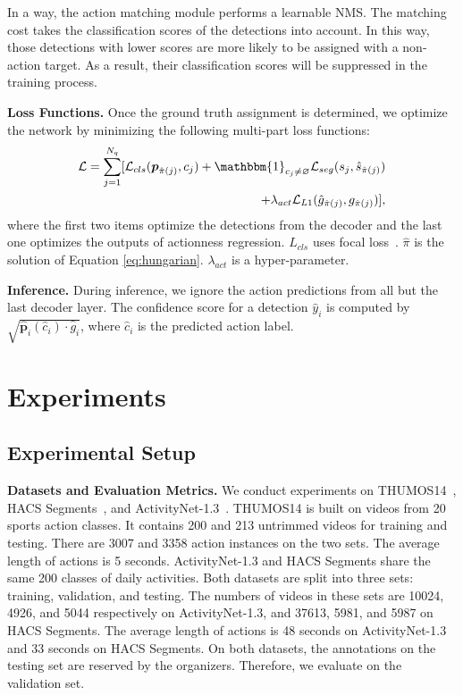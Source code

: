 \documentclass[lettersize,journal]{IEEEtran}
\begin{document}
In a way, the action matching module performs a learnable NMS. The matching cost takes the classification scores of the detections into account. In this way, those detections with lower scores are more likely to be assigned with a non-action target. As a result, their classification scores will be suppressed in the training process.


\vspace{1ex}\noindent\textbf{Loss Functions.} 
Once the ground truth assignment is determined, we optimize the network by minimizing the following multi-part loss functions:
\begin{equation}
\label{eq:loss_func}
\begin{aligned}
    \mathcal{L} = \sum_{j=1}^{N_q} [ \mathcal{L}_{cls}(\boldsymbol{p}_{\hat{\pi}(j)}, c_j) + \mathbbm{1}_{c_j\neq\varnothing}\mathcal{L}_{seg}(s_j, \hat{s}_{\hat{\pi}(j)}) \\
    + \lambda_{act}\mathcal{L}_{L1}(\hat{g}_{\hat{\pi}(j)},g_{\hat{\pi}(j)}) ],
\end{aligned}
\end{equation}
where the first two items optimize the detections from the decoder and the last one optimizes the outputs of actionness regression. $L_{cls}$ uses focal loss~\cite{lin2017focal}. $\hat{\pi}$ is the solution of Equation \ref{eq:hungarian}. $\lambda_{act}$ is a hyper-parameter.

\vspace{1ex}\noindent\textbf{Inference.} During inference, we ignore the action predictions from all but the last decoder layer. The confidence score for a detection $\hat{y}_i$ is computed by $\sqrt{\hat{\boldsymbol{p}}_i(\hat{c}_i) \cdot \hat{g}_i}$, where $\hat{c}_i$ is the predicted action label.





\section{Experiments}
\subsection{Experimental Setup}
\label{subsec:setup}
\noindent\textbf{Datasets and Evaluation Metrics.} We conduct experiments on THUMOS14~\cite{jiang2014thumos}, HACS Segments~\cite{zhao2019hacs}, and ActivityNet-1.3~\cite{caba2015activitynet}.
THUMOS14 is built on videos from 20 sports action classes. It contains 200 and 213 untrimmed videos for training and testing. There are 3007 and 3358 action instances on the two sets. The average length of actions is 5 seconds. ActivityNet-1.3 and HACS Segments share the same 200 classes of daily activities. Both datasets are split into three sets: training, validation, and testing. The numbers of videos in these sets are 10024, 4926, and 5044 respectively on ActivityNet-1.3, and 37613, 5981, and 5987 on HACS Segments. The average length of actions is 48 seconds on ActivityNet-1.3 and 33 seconds on HACS Segments.
On both datasets, the annotations on the testing set are reserved by the organizers. Therefore, we evaluate on the validation set.
\end{document}
